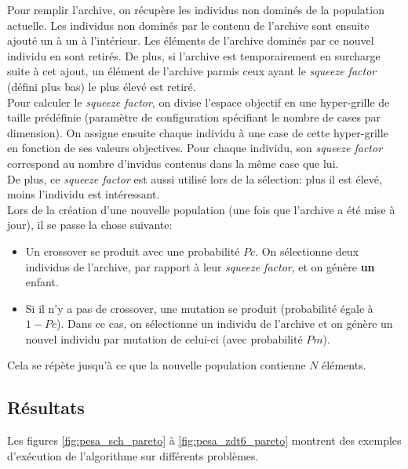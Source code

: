 \documentclass[12pt]{article}
\begin{document}
Pour remplir l'archive, on récupère les individus non dominés de la
population actuelle. Les individus non dominés par le contenu de
l'archive sont ensuite ajouté un à un à l'intérieur. Les éléments de
l'archive dominés par ce nouvel individu en sont retirés. De plus, si
l'archive est temporairement en surcharge suite à cet ajout, un
élément de l'archive parmis ceux ayant le \textit{squeeze factor}
(défini plus bas) le plus élevé est retiré.\\

Pour calculer le \textit{squeeze factor}, on divise l'espace objectif
en une hyper-grille de taille prédéfinie (paramètre de configuration
spécifiant le nombre de cases par dimension). On assigne ensuite
chaque individu à une case de cette hyper-grille en fonction de ses
valeurs objectives. Pour chaque individu, son \textit{squeeze factor}
correspond au nombre d'invidus contenus dans la
même case que lui.\\
De plus, ce \textit{squeeze factor} est aussi utilisé lors de la sélection:
plus il est élevé, moins l'individu est intéressant.\\

Lors de la création d'une nouvelle population (une fois que l'archive
a été mise à jour), il se passe la chose suivante:

\begin{itemize}
  
\item Un crossover se produit avec une probabilité $Pc$. On
  sélectionne deux individus de l'archive, par rapport à leur
  \textit{squeeze factor}, et on génère \textbf{un} enfant.\\
  
\item Si il n'y a pas de crossover, une mutation se produit
  (probabilité égale à $1 - Pc$). Dans ce cas, on sélectionne un
  individu de l'archive et on génère un nouvel individu par mutation
  de celui-ci (avec probabilité $Pm$).
  
\end{itemize}

Cela se répète jusqu'à ce que la nouvelle population contienne $N$
éléments.

\subsection{Résultats}
Les figures \ref{fig:pesa_sch_pareto} à \ref{fig:pesa_zdt6_pareto}
montrent des exemples d'exécution de l'algorithme sur différents
problèmes.\\
\end{document}
